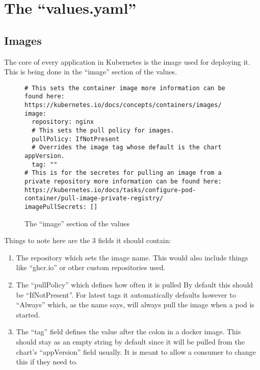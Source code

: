 \section{The \enquote{values.yaml}}

\subsection{Images}

The core of every application in Kubernetes is the image used for deploying it.
This is being done in the \enquote{image} section of the  \gls{values}.

\begin{figure}[h]
\begin{verbatim}
# This sets the container image more information can be found here: https://kubernetes.io/docs/concepts/containers/images/
image:
  repository: nginx
  # This sets the pull policy for images.
  pullPolicy: IfNotPresent
  # Overrides the image tag whose default is the chart appVersion.
  tag: ""
# This is for the secretes for pulling an image from a private repository more information can be found here: https://kubernetes.io/docs/tasks/configure-pod-container/pull-image-private-registry/
imagePullSecrets: []
\end{verbatim}
\caption{The \enquote{image} section of the \gls{values}}\label{code:image_section}
\end{figure}

Things to note here are the 3 fields it should contain:

\begin{enumerate}
	\item{
		The repository which sets the image name.
		This would also include things like \enquote{ghcr.io} or other custom repositories used.
	}
	\item{
		The \enquote{pullPolicy} which defines how often it is pulled
		By default this should be \enquote{IfNotPresent}.
		For latest tags it automatically defaults however to \enquote{Always} which, as the name says, will always pull the image when a \Gls{pod} is started.
	}
	\item{
		The \enquote{tag} field defines the value after the colon in a docker image.
		This should stay as an empty string by default since it will be pulled from the chart's \enquote{appVersion} field usually.
		It is meant to allow a consumer to change this if they need to.
	}
\end{enumerate}

